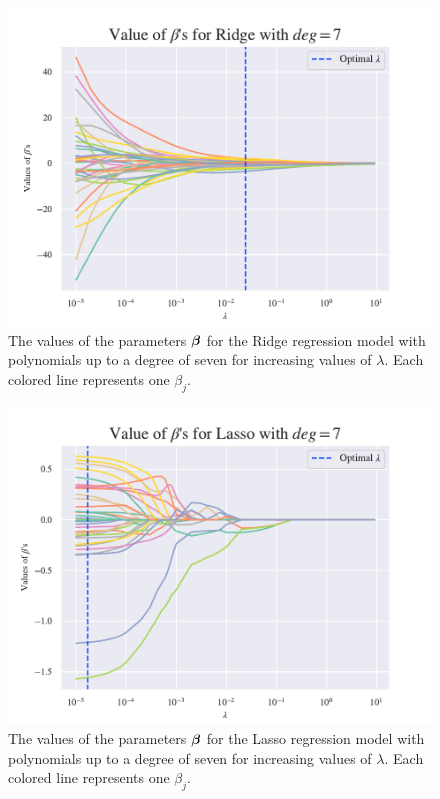 \begin{figure}[h!]
    \centering
    \includegraphics[width=1\linewidth]{project_1/figures/figures_in_report/Ridge_Betas_lambda_Franke_Noise_const_deg.pdf}
    \caption{The values of the parameters $\boldsymbol{\beta}$ for the Ridge regression model with polynomials up to a degree of seven for increasing values of $\lambda$. Each colored line represents one $\beta_j$.}
    \label{fig:ridge_betas}
\end{figure}

\begin{figure}[h!]
    \centering
    \includegraphics[width=1\linewidth]{project_1/figures/figures_in_report/lasso_Betas_lambda_Franke_Noise_const_deg.pdf}
    \caption{The values of the parameters $\boldsymbol{\beta}$ for the Lasso regression model with polynomials up to a degree of seven for increasing values of $\lambda$. Each colored line represents one $\beta_j$.}
    \label{fig:lasso_betas}
\end{figure}

